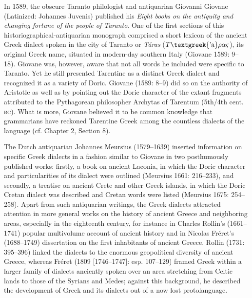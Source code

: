 \documentclass[12pt]{article}
\newenvironment{styleStandard}{\renewcommand\baselinestretch{1.25}\setlength\leftskip{0in}\setlength\rightskip{0in}\setlength\parindent{0.1972in}\setlength\parfillskip{0pt plus 1fil}\setlength\parskip{0in plus 1pt}\writerlistparindent\writerlistleftskip\leavevmode\normalfont\normalsize\writerlistlabel\ignorespaces}{\unskip\vspace{0in plus 1pt}\par}
\newcommand\writerlistleftskip{}
\newcommand\writerlistparindent{}
\newcommand\writerlistlabel{}
\begin{document}
\begin{styleStandard}
In 1589, the obscure Taranto philologist and antiquarian Giovanni Giovane (Latinized: Johannes Juvenis) published his \textit{Eight books on the antiquity and changing fortune of the people of Taranto}. One of the first sections of this historiographical-antiquarian monograph comprised a short lexicon of the ancient Greek dialect spoken in the city of Taranto or \textit{Táras} ($T\text{\textgreek{'a}}\rho \alpha \varsigma $), its original Greek name, situated in modern-day southern Italy (Giovane 1589: 9–18). Giovane was, however, aware that not all words he included were specific to Taranto. Yet he still presented Tarentine as a distinct Greek dialect and recognized it as a variety of Doric. Giovane (1589: 8–9) did so on the authority of Aristotle as well as by pointing out the Doric character of the extant fragments attributed to the Pythagorean philosopher Archytas of Tarentum (5th/4th cent. \textsc{bc}). What is more, Giovane believed it to be common knowledge that grammarians have reckoned Tarentine Greek among the countless dialects of the language (cf. Chapter 2, Section 8).
\end{styleStandard}

\begin{styleStandard}
The Dutch antiquarian Johannes Meursius (1579–1639) inserted information on specific Greek dialects in a fashion similar to Giovane in two posthumously published works: firstly, a book on ancient Laconia, in which the Doric character and particularities of its dialect were outlined (Meursius 1661: 216–233), and secondly, a treatise on ancient Crete and other Greek islands, in which the Doric Cretan dialect was described and Cretan words were listed (Meursius 1675: 254–258). Apart from such antiquarian writings, the Greek dialects attracted attention in more general works on the history of ancient Greece and neighboring areas, especially in the eighteenth century, for instance in Charles Rollin’s (1661–1741) popular multivolume account of ancient history and in Nicolas Fréret’s (1688–1749) dissertation on the first inhabitants of ancient Greece. Rollin (1731: 395–396) linked the dialects to the enormous geopolitical diversity of ancient Greece, whereas Fréret (1809 [1746–1747]: esp. 107–129) framed Greek within a larger family of dialects anciently spoken over an area stretching from Celtic lands to those of the Syrians and Medes; against this background, he described the development of Greek and its dialects out of a now lost protolanguage.
\end{styleStandard}
\end{document}
